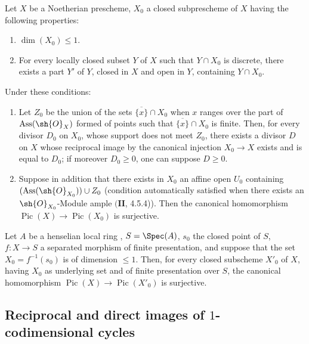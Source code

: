\begin{proposition}[21.9.11]
\label{IV.21.9.11}
Let $X$ be a Noetherian prescheme, $X_0$ a closed subprescheme of $X$ having the following properties:
\begin{enumerate}
  \item[$1\textsuperscript{o}$] $\dim(X_0)\leq 1$.
  \item[$2\textsuperscript{o}$] For every locally closed subset $Y$ of $X$ such that $Y\cap X_0$ is discrete, there exists a part $Y'$ of $Y$, closed in $X$ and open in $Y$, containing $Y\cap X_0$.
\end{enumerate}
Under these conditions:
\begin{enumerate}[label=\emph{(\roman*)}]
  \item Let $Z_0$ be the union of the sets $\overline{\{x\}}\cap X_0$ when $x$ ranges over the part of $\operatorname{Ass}(\sh{O}_X)$ formed of points such that $\overline{\{x\}}\cap X_0$ is finite.
  Then, for every divisor $D_0$ on $X_0$, whose support does not meet $Z_0$, there exists a divisor $D$ on $X$ whose reciprocal image by the canonical injection $X_0\to X$ exists  and is equal to $D_0$;
  if moreover $D_0\geq 0$, one can suppose $D\geq 0$.
  \item Suppose in addition that there exists in $X_0$ an affine open $U_0$ containing $(\operatorname{Ass}(\sh{O}_{X_0}))\cup Z_0$ (condition automatically satisfied when there exists an $\sh{O}_{X_0}$-Module ample $(\mathbf{II}$, 4.5.4)).
  Then the canonical homomorphism  $\operatorname{Pic}(X)\to\operatorname{Pic}(X_0)$ is surjective.
\end{enumerate}
\end{proposition}

\begin{corollary}[21.9.12]
\label{IV.21.9.12}
Let $A$ be a henselian local ring , $S=\Spec(A)$, $s_0$ the closed point of $S$, $f:X\to S$ a separated morphism of finite presentation, and suppose that the set $X_0=f^{-1}(s_0)$ is of dimension $\leq 1$.
Then, for every closed subscheme $X'_0$ of $X$, having $X_0$ as underlying set and of finite presentation over $S$, the canonical homomorphism  $\operatorname{Pic}(X)\to\operatorname{Pic}(X'_0)$ is surjective.
\end{corollary}

\subsection{Reciprocal and direct images of $1$-codimensional cycles}
\label{IV.21.10}

